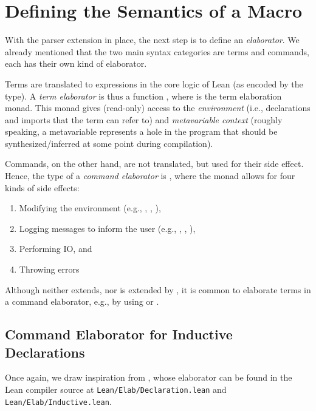 \section{Defining the Semantics of a Macro}
With the parser extension in place, the next step is to define an \emph{elaborator}.
We already mentioned that the two main syntax categories are terms and commands, each has their own kind of elaborator.

Terms are translated to expressions in the core logic of Lean (as encoded by the  type). A \emph{term elaborator} is thus a function , where  is the term elaboration monad. This monad gives (read-only) access to the \emph{environment} (i.e., declarations and imports that the term can refer to) and \emph{metavariable context} (roughly speaking, a metavariable represents a hole in the program that should be synthesized/inferred at some point during compilation).


Commands, on the other hand, are not translated, but used for their side effect. Hence, the type of a \emph{command elaborator} is , where the  monad allows for four kinds of side effects: 
\begin{enumerate}
    \item Modifying the environment (e.g., \inductive{}, , ),
    \item Logging messages to inform the user (e.g., , , ),
    \item Performing IO, and
    \item Throwing errors
\end{enumerate}

Although  neither extends, nor is extended by , it is common to elaborate terms in a command elaborator, e.g., by using  or .







\subsection{Command Elaborator for Inductive Declarations}
Once again, we draw inspiration from \inductive{}, whose elaborator can be found in the Lean compiler source at \texttt{Lean/Elab/Declaration.lean} and \texttt{Lean/Elab/Inductive.lean}.

